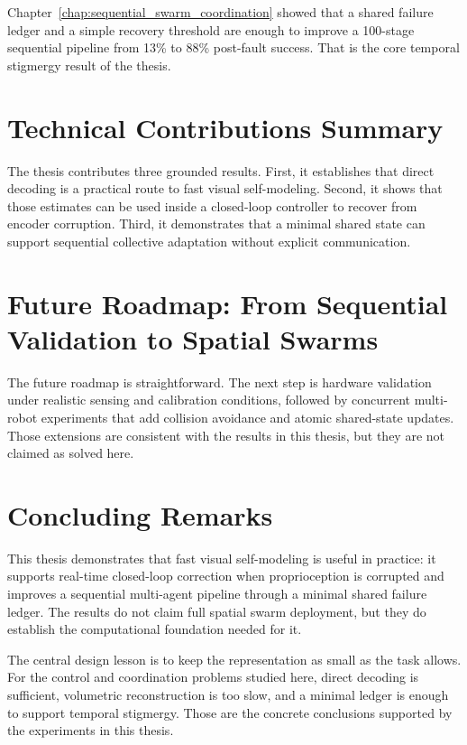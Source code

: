 \documentclass[12pt,a4paper,oneside]{report}
\begin{document}
Chapter~\ref{chap:sequential_swarm_coordination} showed that a shared failure ledger and a simple recovery threshold are enough to improve a 100-stage sequential pipeline from 13\% to 88\% post-fault success. That is the core temporal stigmergy result of the thesis.

\section{Technical Contributions Summary}

The thesis contributes three grounded results. First, it establishes that direct decoding is a practical route to fast visual self-modeling. Second, it shows that those estimates can be used inside a closed-loop controller to recover from encoder corruption. Third, it demonstrates that a minimal shared state can support sequential collective adaptation without explicit communication.

\section{Future Roadmap: From Sequential Validation to Spatial Swarms}

The future roadmap is straightforward. The next step is hardware validation under realistic sensing and calibration conditions, followed by concurrent multi-robot experiments that add collision avoidance and atomic shared-state updates. Those extensions are consistent with the results in this thesis, but they are not claimed as solved here.

\section{Concluding Remarks}

This thesis demonstrates that fast visual self-modeling is useful in practice: it supports real-time closed-loop correction when proprioception is corrupted and improves a sequential multi-agent pipeline through a minimal shared failure ledger. The results do not claim full spatial swarm deployment, but they do establish the computational foundation needed for it.

The central design lesson is to keep the representation as small as the task allows. For the control and coordination problems studied here, direct decoding is sufficient, volumetric reconstruction is too slow, and a minimal ledger is enough to support temporal stigmergy. Those are the concrete conclusions supported by the experiments in this thesis.
\end{document}
